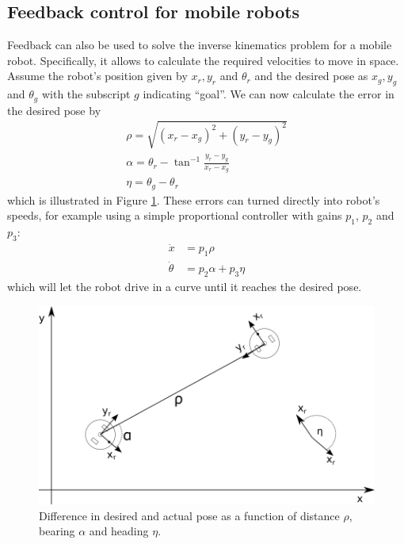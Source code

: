 \subsection{Feedback control for mobile robots}
Feedback can also be used to solve the inverse kinematics problem for a mobile robot. Specifically, it allows to calculate the required velocities to move in space. Assume the robot's position given by $x_r, y_r$ and $\theta_r$ and the desired pose as $x_g, y_g$ and $\theta_g$ with the subscript $g$ indicating ``goal''.
We can now calculate the error in the desired pose by
\begin{eqnarray}
\rho=\sqrt{(x_r-x_g)^2+(y_r-y_g)^2}\\
\nonumber
\alpha=\theta_r-\tan^{-1}{\frac{y_r-y_g}{x_r-x_g}}\\
\nonumber
\eta=\theta_g-\theta_r
\end{eqnarray}
which is illustrated in Figure \ref{fig:trajectorygen}.
These errors can turned directly into robot's speeds, for example using a simple proportional controller with gains $p_1$, $p_2$ and $p_3$: 
\begin{eqnarray}
\dot{x} &= p_1 \rho\\
\dot{\theta} &= p_2 \alpha + p_3 \eta
\end{eqnarray}
which will let the robot drive in a curve until it reaches the desired pose. 

\begin{figure}
	\centering
		\includegraphics[width=\textwidth]{figs/trajectorygen}
	\caption{Difference in desired and actual pose as a function of distance $\rho$, bearing $\alpha$ and heading $\eta$. 
	\label{fig:trajectorygen}}
\end{figure}

